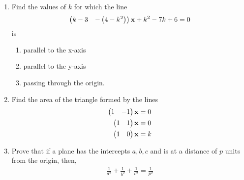 \documentclass[journal,12pt,twocolumn]{IEEEtran}
\renewcommand\thesection{\arabic{section}}
\begin{document}
\begin{enumerate}[label=\thesection.\arabic*.,ref=\thesection.\theenumi]
\item Find the values of $k$ for which the line 
%
\begin{align}
\begin{pmatrix}k-3 & -\left(4-k^2\right)\end{pmatrix}\mathbf{x} +k^2-7k+6= 0
\end{align}
%
is
\begin{enumerate}
\item parallel to the x-axis
\item parallel to the y-axis
\item passing through the origin.
\end{enumerate}
%
\solution
%
\item Find the area of the triangle formed by the lines
%
\begin{align}
\begin{pmatrix}1 & -1\end{pmatrix}\mathbf{x} &= 0
\\
\begin{pmatrix}1 & 1\end{pmatrix}\mathbf{x} &= 0
\\
\begin{pmatrix}1 & 0\end{pmatrix}\mathbf{x} &= k
\end{align}
%
\item Prove that if a plane has the intercepts $a, b, c$ and is at a distance of $p$ units from the origin, then, 
\begin{align}
\frac{1}{a^2}+\frac{1}{b^2}+\frac{1}{c^2}=\frac{1}{p^2} 
\end{align}
\end{enumerate}
\end{document}
